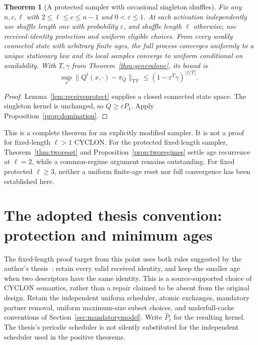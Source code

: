 \documentclass[11pt]{article}
\newtheorem{theorem}{Theorem}
\newcommand{\TV}{\mathrm{TV}}
\begin{document}
\begin{theorem}[A protected sampler with occasional singleton shuffles]
\label{thm:protectedmixture}
Fix any $n,c,\ell$ with $2\le\ell\le c\le n-1$ and
$0<\varepsilon\le1$.
At each activation independently use shuffle length one with
probability $\varepsilon$, and shuffle length $\ell$ otherwise;
use received-identity protection and uniform eligible choices.
From every weakly connected state with arbitrary finite ages,
the full process converges uniformly to a unique stationary
law and its local samples converge to uniform conditional on
availability. With $T,\gamma$ from
Theorem~\ref{thm:generalone}, its bound is
\[
 \sup_x\|Q^t(x,\cdot)-\pi_Q\|_{\TV}
 \le(1-\varepsilon^T\gamma)^{\lfloor t/T\rfloor}.
\]
\end{theorem}
\begin{proof}
Lemma~\ref{lem:receiveprotect} supplies a closed connected
state space. The singleton kernel is unchanged, so
$Q\ge\varepsilon P_1$. Apply
Proposition~\ref{prop:domination}.
\end{proof}

This is a complete theorem for an explicitly modified sampler.
It is not a proof for fixed-length $\ell>1$ CYCLON.
For the protected fixed-length sampler, Theorem~\ref{thm:tworeset}
and Proposition~\ref{prop:tworegimes} settle age recurrence at
$\ell=2$, while a common-regime argument remains outstanding.
For fixed protected $\ell\ge3$, neither a uniform finite-age
reset nor full convergence has been established here.

\section{The adopted thesis convention: protection and minimum ages}
\label{sec:thesis}

The fixed-length proof target from this point uses both rules
suggested by the author's thesis~\cite[Figure 2.3, p.~19]{cyclonthesis}:
retain every valid received identity, and keep the smaller age
when two descriptors have the same identity.
This is a source-supported choice of CYCLON semantics, rather
than a repair claimed to be absent from the original design.
Retain the independent uniform scheduler, atomic exchanges,
mandatory partner removal, uniform maximum-size subset choices,
and underfull-cache conventions of Section~\ref{sec:mandatorymodel}.
Write $\widehat P_\ell$ for the resulting kernel.
The thesis's periodic scheduler is not silently substituted for
the independent scheduler used in the positive theorems.
\end{document}
